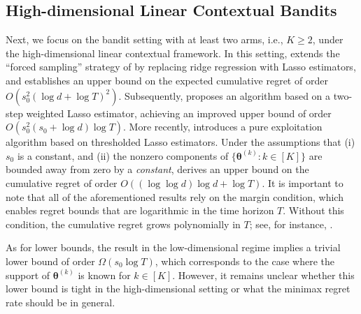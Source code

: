 \documentclass[aos,preprint]{imsart}
\theoremstyle{plain}
\theoremstyle{definition}
\newcommand{\btheta}{\boldsymbol{\theta}}
\begin{document}
\subsection{High-dimensional Linear Contextual Bandits}
Next, we focus on the bandit setting with at least two arms, i.e., $K \geq 2$, under the high-dimensional linear contextual framework. In this setting, \cite{bastani2020online} extends the ``forced sampling'' strategy of \cite{goldenshluger2013linear} by replacing ridge regression with Lasso estimators, and establishes an upper bound on the expected cumulative regret of order $O(s_0^2(\log d + \log T)^2)$. Subsequently, \cite{wang2018minimax} proposes an algorithm based on a two-step weighted Lasso estimator, achieving an improved upper bound of order $O(s_0^2(s_0 + \log d)\log T)$. More recently, \cite{ariu2022thresholded} introduces a pure exploitation algorithm based on thresholded Lasso estimators. Under the assumptions that (i) $s_0$ is a constant, and (ii) the nonzero components of $\{\btheta^{(k)}: k \in [K]\}$ are bounded away from zero by a \textit{constant},
\cite{ariu2022thresholded} derives an upper bound on the cumulative regret of order $O((\log\log d)  \log d  +  \log T)$. 
It is important to note that all of the aforementioned results rely on the margin condition, which enables regret bounds that are logarithmic in the time horizon $T$. Without this condition, the cumulative regret grows polynomially in $T$; see, for instance, \cite{kim2019doubly, oh2021sparsity, ariu2022thresholded, ren2024dynamic}.  

As for lower bounds, the result in the low-dimensional regime \cite{song2022truncated} implies a trivial lower bound of order $\Omega(s_0 \log T)$, which corresponds to the case where the support of $\btheta^{(k)}$ is known for $k \in [K]$. However, it remains unclear whether this lower bound is tight in the high-dimensional setting or what the minimax regret rate should be in general. 
\end{document}
